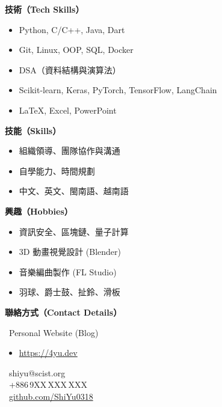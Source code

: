 \documentclass[12pt, a4paper]{article}
\newcommand{\headleft}[1]{%
    \vspace*{3ex}\textbf{#1}\par%
    \vspace*{-1.5ex}\hrulefill\par\vspace*{0.7ex}%
}
\begin{document}
\begin{minipage}[t]{0.35\textwidth}
{\begin{minipage}[t][297mm][t]{0.82\textwidth}
            \headleft{技術（Tech Skills）}
            \begin{itemize}
                \item Python, C/C++, Java, Dart
                \item Git, Linux, OOP, SQL, Docker
                \item DSA（資料結構與演算法）
                \item Scikit-learn, Keras, PyTorch, TensorFlow, LangChain
                \item \LaTeX, Excel, PowerPoint
            \end{itemize} 
            \vspace*{-0.5em}
            \headleft{技能（Skills）}
            \begin{itemize}
                \item 組織領導、團隊協作與溝通
                \item 自學能力、時間規劃
                \item 中文、英文、閩南語、越南語
            \end{itemize} 
            \vspace*{-0.5em}
            \headleft{興趣（Hobbies）}
            \begin{itemize}
                \item 資訊安全、區塊鏈、量子計算
                \item 3D 動畫視覺設計 (Blender)
                \item 音樂編曲製作 (FL Studio)
                \item 羽球、爵士鼓、扯鈴、滑板
            \end{itemize} 
            \vspace*{-0.5em}
            \headleft{聯絡方式（Contact Details）}
            \faGlobe\ Personal Website (Blog)
            \begin{itemize}[leftmargin=3em, label=→]
                \item \href{https://4yu.dev}{https://4yu.dev}
            \end{itemize}
            \faEnvelope\ {shiyu@scist.org} \\[0.4ex]
            \faPhone\ +886\,9XX\,XXX\,XXX \\[0.5ex]
            \faGithub\ \href{https://github.com/ShiYu0318}{github.com/ShiYu0318} \\[0.1ex]
        \end{minipage}%
        \textwidth\relax
    }
\end{minipage}%
\end{document}
